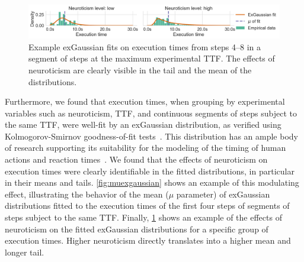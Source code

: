\begin{figure}
    \centering
    \includegraphics[width=\textwidth]{figs/new_model/dist_fits_neuro.png}
    \caption{%
        Example \ac{exGaussian} fits on execution times from steps \numrange{4}{8} in a segment of steps at the maximum experimental \ac{TTF}.
        The effects of neuroticism are clearly visible in the tail and the mean of the distributions.
    }\label{fig:fitsneuro}
\end{figure}

Furthermore, we found that execution times, when grouping by experimental variables such as neuroticism, \ac{TTF}, and continuous segments of steps subject to the same \ac{TTF}, were well-fit by an \ac{exGaussian} distribution, as verified using Kolmogorov-Smirnov goodness-of-fit tests~\cite{massey1951kolmogorov}.
This distribution has an ample body of research supporting its suitability for the modeling of the timing of human actions and reaction times~\cite{Rohrer1994analysis,Palmer2011shapes,Marmolejo2022generalised}.
We found that the effects of neuroticism on execution times were clearly identifiable in the fitted distributions, in particular in their means and tails.
\cref{fig:muexgaussian} shows an example of this modulating effect, illustrating the behavior of the mean (\( \mu \) parameter) of \ac{exGaussian} distributions fitted to the execution times of the first four steps of segments of steps subject to the same \ac{TTF}.
Finally, \cref{fig:fitsneuro} shows an example of the effects of neuroticism on the fitted \ac{exGaussian} distributions for a specific group of execution times.
Higher neuroticism directly translates into a higher mean and longer tail.